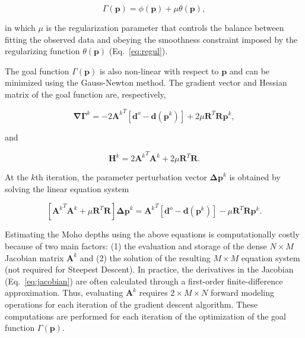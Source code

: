 \documentclass[extra,mreferee]{gji}
\begin{document}
\begin{equation}
    \Gamma(\mathbf{p}) = \phi(\mathbf{p}) + \mu\theta(\mathbf{p}),
    \label{eq:goalfunction}
\end{equation}

\noindent
in which $\mu$ is the regularization parameter that controls the balance
between fitting the observed data and obeying the smoothness constraint imposed
by the regularizing function $\theta(\mathbf{p})$ (Eq.~\ref{eq:regul}).

The goal function $\Gamma(\mathbf{p})$ is also non-linear with respect to
$\mathbf{p}$ and can be minimized using the Gauss-Newton method.
The gradient vector and Hessian matrix of the goal function are, respectively,

\begin{equation}
    \mathbf{\nabla\Gamma}^k =
        -2{\mathbf{A}^k}^T[\mathbf{d}^o - \mathbf{d}(\mathbf{p}^k)] +
        2\mu\mathbf{R}^T\mathbf{R}\mathbf{p}^k,
    \label{eq:gradient-regul}
\end{equation}

\noindent and

\begin{equation}
    \mathbf{H}^k = 2{\mathbf{A}^k}^T{\mathbf{A}^k}
                   + 2\mu\mathbf{R}^T\mathbf{R}.
    \label{eq:hessian-regul}
\end{equation}

At the $k$th iteration, the parameter perturbation vector
$\mathbf{\Delta p}^k$ is obtained by solving the linear equation system

\begin{equation}
    \left[{\mathbf{A}^k}^T{\mathbf{A}^k} + \mu\mathbf{R}^T\mathbf{R}\right]
    \mathbf{\Delta p}^k =
    {\mathbf{A}^k}^T[\mathbf{d}^o - \mathbf{d}(\mathbf{p}^k)] -
    \mu\mathbf{R}^T\mathbf{R}\mathbf{p}^k.
    \label{eq:gaussnewton-regul}
\end{equation}

Estimating the Moho depths using the above equations is computationally
costly because of two main factors:
(1) the evaluation and storage of the dense $N \times M$ Jacobian matrix
${\mathbf{A}^k}$
and (2) the solution of the resulting $M \times M$ equation system
(not required for Steepest Descent).
In practice, the derivatives in the Jacobian (Eq.~\ref{eq:jacobian})
are often calculated through a first-order finite-difference approximation.
Thus, evaluating ${\mathbf{A}^k}$ requires $2\times M \times N$ forward modeling
operations for each iteration of the gradient descent algorithm.
These computations are performed for each iteration of the optimization
of the goal function $\Gamma(\mathbf{p})$.
\end{document}
